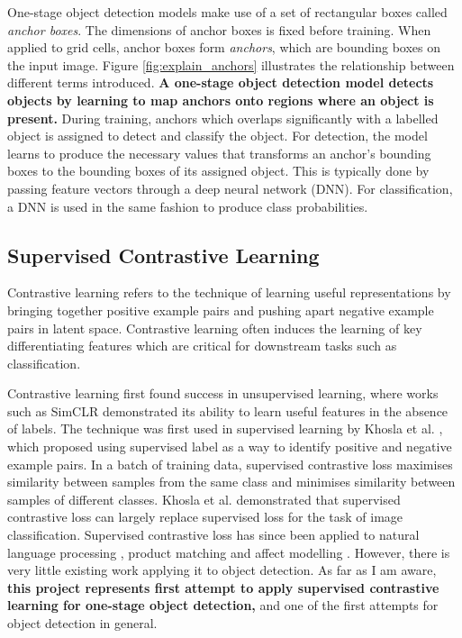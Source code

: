 \documentclass[12pt,a4paper,twoside,openany]{report}
\begin{document}
One-stage object detection models make use of a set of rectangular boxes called \textit{anchor boxes}. The dimensions of anchor boxes is fixed before training. When applied to grid cells, anchor boxes form \textit{anchors}, which are bounding boxes on the input image. Figure \ref{fig:explain_anchors} illustrates the relationship between different terms introduced. \textbf{A one-stage object detection model detects objects by learning to map anchors onto regions where an object is present.} During training, anchors which overlaps significantly with a labelled object is assigned to detect and classify the object. For detection, the model learns to produce the necessary values that transforms an anchor's bounding boxes to the bounding boxes of its assigned object. This is typically done by passing feature vectors through a deep neural network (DNN). For classification, a DNN is used in the same fashion to produce class probabilities.


\subsection{Supervised Contrastive Learning}
Contrastive learning refers to the technique of learning useful representations by bringing together positive example pairs and pushing apart negative example pairs in latent space. Contrastive learning often induces the learning of key differentiating features which are critical for downstream tasks such as classification.

Contrastive learning first found success in unsupervised learning, where works such as SimCLR \cite{chen_simple_2020} demonstrated its ability to learn useful features in the absence of labels.
The technique was first used in supervised learning by Khosla et al. \cite{khosla_supervised_2021}, which proposed using supervised label as a way to identify positive and negative example pairs. In a batch of training data, supervised contrastive loss maximises similarity between samples from the same class and minimises similarity between samples of different classes. Khosla et al. demonstrated that supervised contrastive loss can largely replace supervised loss for the task of image classification. Supervised contrastive loss has since been applied to natural language processing \cite{gunel_supervised_2021}, product matching \cite{peeters_supervised_2022} and affect modelling \cite{pinitas_supervised_2022}. However, there is very little existing work applying it to object detection. As far as I am aware, \textbf{this project represents first attempt to apply supervised contrastive learning for one-stage object detection,} and one of the first attempts for object detection in general.
\end{document}

